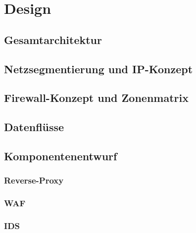 \chapter{Design}\label{chap:design}


\section{Gesamtarchitektur}\label{sec:gesamtarchitektur}


\section{Netzsegmentierung und IP-Konzept}\label{sec:netzsegmentierung-und-ip-konzept}


\section{Firewall-Konzept und Zonenmatrix}\label{sec:firewall-konzept-und-zonenmatrix}


\section{Datenflüsse}\label{sec:datenfluesse}


\section{Komponentenentwurf}\label{sec:komponentenentwurf}


\subsection{Reverse-Proxy}\label{subsec:komponentenentwurf-reverse-proxy}


\subsection{WAF}\label{subsec:komponentenentwurf-waf}


\subsection{IDS}\label{subsec:komponentenentwurf-ids}

